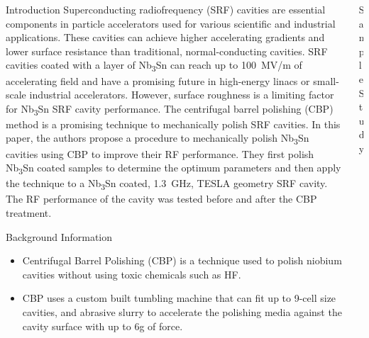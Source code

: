 \documentclass{beamer}
\begin{document}
\begin{frame}{}
        \begin{columns}[t]
            \begin{column}{0.32\linewidth}
                \begin{block}{\label{sec:introduction}Introduction}
                    Superconducting radiofrequency (SRF) cavities are essential components in particle accelerators used for various scientific and industrial applications. These cavities can achieve higher accelerating gradients and lower surface resistance than traditional, normal-conducting cavities. SRF cavities coated with a layer of Nb\textsubscript{3}Sn can reach up to 100~MV/m of accelerating field and have a promising future in high-energy linacs or small-scale industrial accelerators. However, surface roughness is a limiting factor for Nb\textsubscript{3}Sn SRF cavity performance. The centrifugal barrel polishing (CBP) method is a promising technique to mechanically polish SRF cavities. In this paper, the authors propose a procedure to mechanically polish Nb\textsubscript{3}Sn cavities using CBP to improve their RF performance. They first polish Nb\textsubscript{3}Sn coated samples to determine the optimum parameters and then apply the technique to a Nb\textsubscript{3}Sn coated, 1.3~GHz, TESLA geometry SRF cavity. The RF performance of the cavity was tested before and after the CBP treatment.
                \end{block}
                \begin{block}{\label{sec:backgroundinformation}Background Information}
                    \begin{itemize}
                        \item Centrifugal Barrel Polishing (CBP) is a technique used to polish niobium cavities without using toxic chemicals such as HF.
                        \item CBP uses a custom built tumbling machine that can fit up to 9-cell size cavities, and abrasive slurry to accelerate the polishing media against the cavity surface with up to 6g of force.
                    \end{itemize}  
                \end{block}
            \end{column}
            \begin{column}{0.32\linewidth}    
                \begin{block}{\label{sec:samplestudy}Sample Study}
                    \begin{figure}

\end{figure}
\end{block}
\end{column}
\end{columns}
\end{frame}
\end{document}
